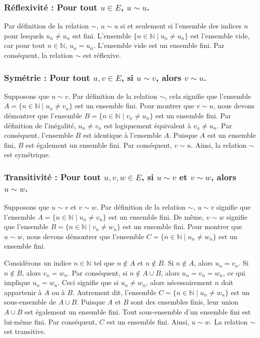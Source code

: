 \documentclass{report}
\begin{document}
\subsubsection*{Réflexivité : Pour tout $u \in E$, $u \sim u$.}
Par définition de la relation $\sim$, $u \sim u$ si et seulement si l'ensemble des indices $n$ pour lesquels $u_n \neq u_n$ est fini.
L'ensemble $\{ n \in \mathbb{N} \mid u_n \neq u_n \}$ est l'ensemble vide, car pour tout $n \in \mathbb{N}$, $u_n = u_n$.
L'ensemble vide est un ensemble fini.
Par conséquent, la relation $\sim$ est réflexive.

\subsubsection*{Symétrie : Pour tout $u, v \in E$, si $u \sim v$, alors $v \sim u$.}
Supposons que $u \sim v$.
Par définition de la relation $\sim$, cela signifie que l'ensemble $A = \{ n \in \mathbb{N} \mid u_n \neq v_n \}$ est un ensemble fini.
Pour montrer que $v \sim u$, nous devons démontrer que l'ensemble $B = \{ n \in \mathbb{N} \mid v_n \neq u_n \}$ est un ensemble fini.
Par définition de l'inégalité, $u_n \neq v_n$ est logiquement équivalent à $v_n \neq u_n$.
Par conséquent, l'ensemble $B$ est identique à l'ensemble $A$.
Puisque $A$ est un ensemble fini, $B$ est également un ensemble fini.
Par conséquent, $v \sim u$.
Ainsi, la relation $\sim$ est symétrique.

\subsubsection*{Transitivité : Pour tout $u, v, w \in E$, si $u \sim v$ et $v \sim w$, alors $u \sim w$.}
Supposons que $u \sim v$ et $v \sim w$.
Par définition de la relation $\sim$, $u \sim v$ signifie que l'ensemble $A = \{ n \in \mathbb{N} \mid u_n \neq v_n \}$ est un ensemble fini.
De même, $v \sim w$ signifie que l'ensemble $B = \{ n \in \mathbb{N} \mid v_n \neq w_n \}$ est un ensemble fini.
Pour montrer que $u \sim w$, nous devons démontrer que l'ensemble $C = \{ n \in \mathbb{N} \mid u_n \neq w_n \}$ est un ensemble fini.

Considérons un indice $n \in \mathbb{N}$ tel que $n \notin A$ et $n \notin B$.
Si $n \notin A$, alors $u_n = v_n$.
Si $n \notin B$, alors $v_n = w_n$.
Par conséquent, si $n \notin A \cup B$, alors $u_n = v_n = w_n$, ce qui implique $u_n = w_n$.
Ceci signifie que si $u_n \neq w_n$, alors nécessairement $n$ doit appartenir à $A$ ou à $B$.
Autrement dit, l'ensemble $C = \{ n \in \mathbb{N} \mid u_n \neq w_n \}$ est un sous-ensemble de $A \cup B$.
Puisque $A$ et $B$ sont des ensembles finis, leur union $A \cup B$ est également un ensemble fini.
Tout sous-ensemble d'un ensemble fini est lui-même fini.
Par conséquent, $C$ est un ensemble fini.
Ainsi, $u \sim w$.
La relation $\sim$ est transitive.
\end{document}
